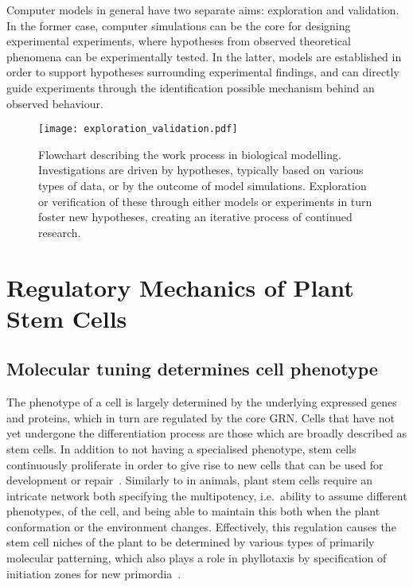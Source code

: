 Computer models in general have two separate aims: exploration and validation.
In the former case, computer simulations can be the core for designing
experimental experiments, where hypotheses from observed theoretical phenomena
can be experimentally tested. In the latter, models are established in order to
support hypotheses surrounding experimental findings, and can directly guide
experiments through the identification possible mechanism behind an observed
behaviour.
\begin{figure}[H]
  \centering
  \texttt{[image: exploration\_validation.pdf]}
  \caption[Modelling biological systems: an illustration]{Flowchart describing
    the work process in biological modelling. Investigations are driven by
    hypotheses, typically based on various types of data, or by the outcome of
    model simulations. Exploration or verification of these through either
    models or experiments in turn foster new hypotheses, creating an iterative
    process of continued research.}  
  \label{fig:expl_val}
\end{figure}


\section{Regulatory Mechanics of Plant Stem Cells} %
\subsection{Molecular tuning determines cell phenotype} %
The phenotype of a cell is largely determined by the underlying
expressed genes and proteins, which in turn are regulated by the core GRN. Cells
that have not yet undergone the differentiation process are those which are
broadly described as stem cells. In addition to not having a specialised phenotype,
stem cells continuously proliferate in order to give rise to new cells that can
be used for development or repair~\cite{clark2001cell}.
Similarly to in animals, plant stem cells require an intricate network both
specifying the multipotency, i.e.\ ability to assume different phenotypes, of
the cell, and being able to maintain this both when the plant  
conformation or the environment changes. Effectively, this regulation causes the
stem cell niches of the plant to be determined by various types of primarily
molecular patterning, which also plays a role in phyllotaxis by specification of
initiation zones for new primordia~\cite{reinhardt2003regulation}.

